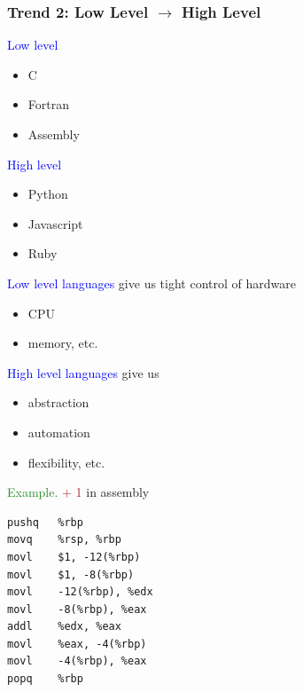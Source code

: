 \documentclass[
    xcolor={svgnames,dvipsnames},
    hyperref={colorlinks, citecolor=DeepPink4, linkcolor=DarkRed, urlcolor=DarkBlue}
    ]{beamer}  %
\newcommand{\Eg}{\textcolor{ForestGreen}{Example. }}
\newcommand{\brown}[1]{\textcolor{Brown}{\sf #1}}
\newcommand{\blue}[1]{\textcolor{Blue}{\sf #1}}
\newcommand{\1}{\mathbbm 1}
\begin{document}
\begin{frame}
    \frametitle{Trend 2: Low Level $\to$ High Level}
    
    \blue{Low level} 
    
    \begin{itemize}
        \item C
        \item Fortran
        \item Assembly
    \end{itemize}

    \vspace{1em}

    \blue{High level } 

    \begin{itemize}
        \item Python
        \item Javascript
        \item Ruby
    \end{itemize}

\end{frame}


\begin{frame}
    
    \blue{Low level languages} give us tight control of hardware

    \begin{itemize}
        \item CPU
        \item memory, etc.
    \end{itemize}

    \vspace{0.5em}
    \vspace{0.5em}
    \vspace{0.5em}

    \blue{High level languages} give us 
    \begin{itemize}
        \item abstraction
        \item automation
        \item flexibility, etc.
    \end{itemize}

\end{frame}




\begin{frame}[fragile]

    \Eg \brown{1 + 1} in assembly

    {\small
    \begin{verbatim}
pushq   %rbp
movq    %rsp, %rbp
movl    $1, -12(%rbp)
movl    $1, -8(%rbp)
movl    -12(%rbp), %edx
movl    -8(%rbp), %eax
addl    %edx, %eax
movl    %eax, -4(%rbp)
movl    -4(%rbp), %eax
popq    %rbp
    \end{verbatim}
    }

\end{frame}
\end{document}
